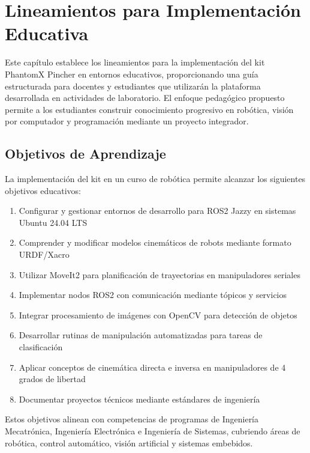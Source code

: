 \section{Lineamientos para Implementación Educativa}

Este capítulo establece los lineamientos para la implementación del kit PhantomX Pincher en entornos educativos, proporcionando una guía estructurada para docentes y estudiantes que utilizarán la plataforma desarrollada en actividades de laboratorio. El enfoque pedagógico propuesto permite a los estudiantes construir conocimiento progresivo en robótica, visión por computador y programación mediante un proyecto integrador.

\subsection{Objetivos de Aprendizaje}

La implementación del kit en un curso de robótica permite alcanzar los siguientes objetivos educativos:

\begin{enumerate}
    \item Configurar y gestionar entornos de desarrollo para ROS2 Jazzy en sistemas Ubuntu 24.04 LTS
    \item Comprender y modificar modelos cinemáticos de robots mediante formato URDF/Xacro
    \item Utilizar MoveIt2 para planificación de trayectorias en manipuladores seriales
    \item Implementar nodos ROS2 con comunicación mediante tópicos y servicios
    \item Integrar procesamiento de imágenes con OpenCV para detección de objetos
    \item Desarrollar rutinas de manipulación automatizadas para tareas de clasificación
    \item Aplicar conceptos de cinemática directa e inversa en manipuladores de 4 grados de libertad
    \item Documentar proyectos técnicos mediante estándares de ingeniería
\end{enumerate}

Estos objetivos alinean con competencias de programas de Ingeniería Mecatrónica, Ingeniería Electrónica e Ingeniería de Sistemas, cubriendo áreas de robótica, control automático, visión artificial y sistemas embebidos.

